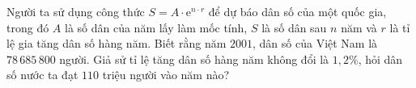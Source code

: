 \begin{ex}%
	Người ta sử dụng công thức $S=A\cdot \mathrm{e}^{n\cdot r}$ để dự báo dân số của một quốc gia, trong đó $A$ là số dân của năm lấy làm mốc tính, $S$ là số dân sau $n$ năm và $r$ là tỉ lệ  gia tăng dân số hàng năm. Biết rằng năm $2001$, dân số của Việt Nam là $78\,685\,800$ người. Giả sử tỉ lệ tăng dân số hàng năm không đổi là $1,2\%$, hỏi dân số nước ta đạt $110$ triệu người vào năm nào?
\end{ex}

